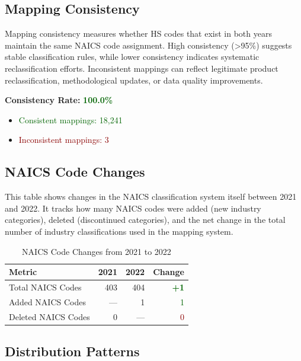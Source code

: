 \documentclass[11pt]{article}
\newcommand{\increase}[1]{\textcolor{darkgreen}{\textbf{+#1}}}
\begin{document}
\subsection{Mapping Consistency}

Mapping consistency measures whether HS codes that exist in both years maintain the same NAICS code assignment. High consistency (>95\%) suggests stable classification rules, while lower consistency indicates systematic reclassification efforts. Inconsistent mappings can reflect legitimate product reclassification, methodological updates, or data quality improvements.


\textbf{Consistency Rate:} \textcolor{darkgreen}{\textbf{100.0\%}}

\begin{itemize}
    \item \textcolor{darkgreen}{Consistent mappings: 18,241}
    \item \textcolor{darkred}{Inconsistent mappings: 3}
\end{itemize}

\subsection{NAICS Code Changes}

This table shows changes in the NAICS classification system itself between 2021 and 2022. It tracks how many NAICS codes were added (new industry categories), deleted (discontinued categories), and the net change in the total number of industry classifications used in the mapping system.

\begin{table}[H]
\centering
{}
\begin{tabular}{lrrr}
\toprule
\textbf{Metric} & \textbf{2021} & \textbf{2022} & \textbf{Change} \\
\midrule
Total NAICS Codes & 403 & 404 & \increase{1} \\
Added NAICS Codes & --- & 1 & \textcolor{darkgreen}{1} \\
Deleted NAICS Codes & 0 & --- & \textcolor{darkred}{0} \\
\bottomrule
\end{tabular}
\caption{NAICS Code Changes from 2021 to 2022}
\end{table}

\subsection{Distribution Patterns}
\end{document}
